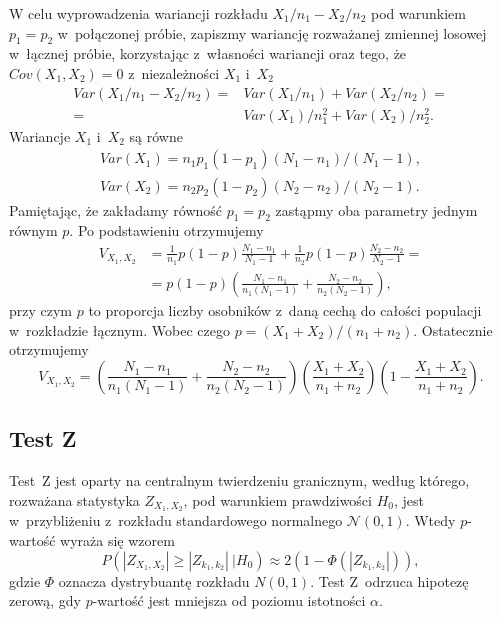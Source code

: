 W celu wyprowadzenia wariancji rozkładu $X_1/n_1-X_2/n_2$ pod warunkiem $p_1=p_2$ w~połączonej próbie, zapiszmy wariancję rozważanej zmiennej losowej w~łącznej próbie, korzystając z~własności wariancji oraz tego, że $Cov(X_1,X_2)=0$ z~niezależności $X_1$ i~$X_2$
\begin{equation}
\begin{split}
Var(X_1/n_1-X_2/n_2)=&Var(X_1/n_1) + Var(X_2/n_2) =\\
 =& Var(X_1)/n_1^2+Var(X_2)/n_2^2.
\end{split}
\end{equation}
Wariancje $X_1$ i~$X_2$ są równe
\begin{align}
Var(X_1)=n_1 p_1 (1-p_1)(N_1-n_1)/(N_1-1),\\
Var(X_2)=n_2 p_2 (1-p_2)(N_2-n_2)/(N_2-1).
\end{align}
Pamiętając, że zakładamy równość $p_1=p_2$ zastąpmy oba parametry jednym równym $p$. Po podstawieniu otrzymujemy
\begin{equation}
\begin{split}
V_{X_1,X_2} & = \frac{1}{n_1}p(1-p)\frac{N_1-n_1}{N_1-1} + \frac{1}{n_2}p(1-p)\frac{N_2-n_2}{N_2-1}= \\
&= p(1-p)\left(\frac{N_1-n_1}{n_1(N_1-1)}+\frac{N_2-n_2}{n_2(N_2-1)}\right),
\end{split}
\end{equation}
przy czym $p$ to proporcja liczby osobników z~daną cechą do całości populacji w~rozkładzie łącznym. Wobec czego $p=(X_1+X_2)/(n_1+n_2)$. Ostatecznie otrzymujemy
\begin{equation}
V_{X_1,X_2} = \left(\frac{N_1-n_1}{n_1(N_1-1)}+\frac{N_2-n_2}{n_2(N_2-1)}\right)\left(\frac{X_1+X_2}{n_1+n_2}\right)\left(1-\frac{X_1+X_2}{n_1+n_2}\right).
\end{equation}

\subsection{Test Z}
Test~Z jest oparty na centralnym twierdzeniu granicznym, według którego, rozważana statystyka $Z_{X_1,X_2}$, pod warunkiem prawdziwości $H_0$, jest w~przybliżeniu z~rozkładu standardowego normalnego $\mathcal{N}(0,1)$. Wtedy $p$-wartość wyraża się wzorem
\begin{equation}
P(|Z_{X_1,X_2}|\geq|Z_{k_1,k_2}|\ |H_0) \approx 2(1-\Phi(|Z_{k_1,k_2}|)),
\end{equation}
gdzie $\Phi$ oznacza dystrybuantę rozkładu $N(0,1)$. Test Z~odrzuca hipotezę zerową, gdy $p$-wartość jest mniejsza od poziomu istotności $\alpha$.

